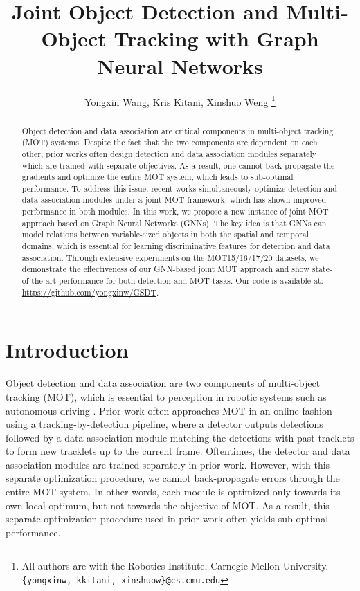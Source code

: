 \documentclass[letterpaper, 10 pt, conference]{ieeeconf}
\title{\LARGE \bf {Joint Object Detection and Multi-Object Tracking with Graph Neural Networks}
\vspace{-0.2cm}}
\author{Yongxin Wang, Kris Kitani, Xinshuo Weng 
\vspace{-1cm}
\thanks{All authors are with the Robotics Institute,
        Carnegie Mellon University. {\tt\small \{yongxinw, kkitani, xinshuow\}@cs.cmu.edu}}
        }
\begin{document}
\maketitle
\thispagestyle{empty}
\pagestyle{empty}

\begin{abstract}

Object detection and data association are critical components in multi-object tracking (MOT) systems. Despite the fact that the two components are dependent on each other, prior works often design detection and data association modules separately which are trained with separate objectives. As a result, one cannot back-propagate the gradients and optimize the entire MOT system, which leads to sub-optimal performance. To address this issue, recent works simultaneously optimize detection and data association modules under a joint MOT framework, which has shown improved performance in both modules. In this work, we propose a new instance of joint MOT approach based on Graph Neural Networks (GNNs). The key idea is that GNNs can model relations between variable-sized objects in both the spatial and temporal domains, which is essential for learning discriminative features for detection and data association. Through extensive experiments on the MOT15/16/17/20 datasets, we demonstrate the effectiveness of our GNN-based joint MOT approach and show state-of-the-art performance for both detection and MOT tasks. Our code is available at: \textcolor{blue}{\url{https://github.com/yongxinw/GSDT}}.

\end{abstract} 
\section{Introduction \label{sec:intro}}

Object detection \cite{Girshick2015, Ren2015, Zagoruyko2016, Redmon2016, Lin2017, Singh2018, Weng2019, He2019} and data association \cite{Xiang2015, Bewley2016, Wojke2017, Schulter2017, Maksai2017, Weng2020_AB3DMOT, Karunasekera2019, Wang20192} are two components of multi-object tracking (MOT), which is essential to perception in robotic systems such as autonomous driving \cite{Luo2018, Wang2018, Yurtsever2019, Badue2019, Weng2020_SPF2}. Prior work \cite{Bewley2016, Weng2020_AB3DMOT} often approaches MOT in an online fashion using a tracking-by-detection pipeline, where a detector outputs detections followed by a data association module matching the detections with past tracklets to form new tracklets up to the current frame. Oftentimes, the detector and data association modules are trained separately in prior work. However, with this separate optimization procedure, we cannot back-propagate errors through the entire MOT system. In other words, each module is optimized only towards its own local optimum, but not towards the objective of MOT. As a result, this separate optimization procedure used in prior work often yields sub-optimal performance. 
\end{document}
